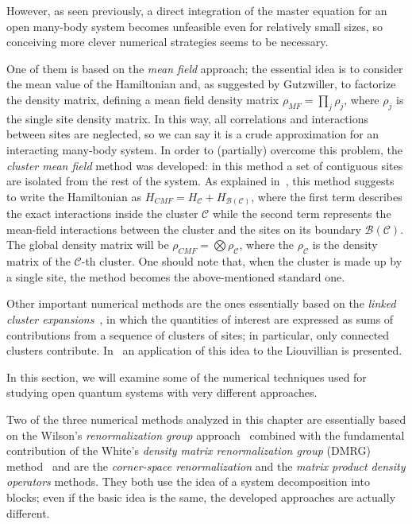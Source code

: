 However, as seen previously, a direct integration of the master equation for an open many-body system becomes unfeasible even for relatively small sizes, so conceiving more clever numerical strategies seems to be necessary.

One of them is based on the \emph{mean field} approach; the essential idea is to consider the mean value of the Hamiltonian and, as suggested by Gutzwiller, to factorize the density matrix, defining a mean field density matrix $\rho_{MF} = \prod_j\rho_j$, where $\rho_j$ is the single site density matrix. In this way, all correlations and interactions between sites are neglected, so we can say it is a crude approximation for an interacting many-body system. In order to (partially) overcome this problem, the \emph{cluster mean field} method was developed: in this method a set of contiguous sites are isolated from the rest of the system. As explained in~\cite{jin_biella_ross}, this method suggests to write the Hamiltonian as $H_{CMF} = H_\mathcal{C} + H_{\mathcal{B(C)}}$, where the first term describes the exact interactions inside the cluster $\mathcal{C}$ while the second term represents the mean-field interactions between the cluster and the sites on its boundary $\mathcal{B(C)}$. The global density matrix will be $\rho_{CMF} = \bigotimes \rho_\mathcal{C}$, where the $\rho_\mathcal{C}$ is the density matrix of the $\mathcal{C}$-th cluster. One should note that, when the cluster is made up by a single site, the method becomes the above-mentioned standard one. 

Other important numerical methods are the ones essentially based on the \emph{linked cluster expansions}~\cite{oitmaa}, in which the quantities of interest are expressed as sums of contributions from a sequence of clusters of sites; in particular, only connected clusters contribute. In~\cite{PhysRevX.6.021037} an application of this idea to the Liouvillian is presented.

In this section, we will examine some of the numerical techniques used for studying open quantum systems with very different approaches.

Two of the three numerical methods analyzed in this chapter are essentially based on the Wilson's \emph{renormalization group} approach~\cite{RevModPhys.47.773} combined with the fundamental contribution of the White's \emph{density matrix renormalization group} (DMRG) method~\cite{s_white:dmrg} and are the \emph{corner-space renormalization} and the \emph{matrix product density operators} methods. They both use the idea of a system decomposition into blocks; even if the basic idea is the same, the developed approaches are actually different.

